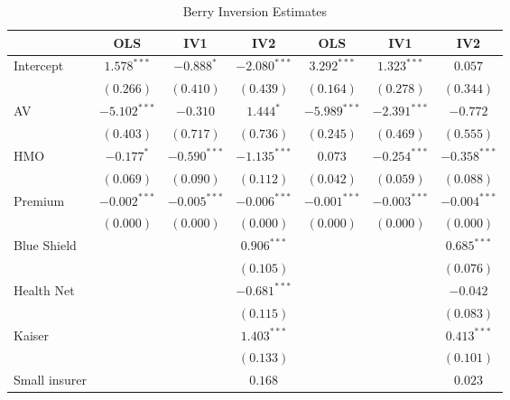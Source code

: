 
\begin{table}
\caption{Berry Inversion Estimates}
\begin{center}
\begin{tabular}{l c c c c c c}
\hline
 & OLS & IV1 & IV2 & OLS & IV1 & IV2 \\
\hline
Intercept     & $1.578^{***}$  & $-0.888^{*}$   & $-2.080^{***}$ & $3.292^{***}$  & $1.323^{***}$  & $0.057$        \\
              & $(0.266)$      & $(0.410)$      & $(0.439)$      & $(0.164)$      & $(0.278)$      & $(0.344)$      \\
AV            & $-5.102^{***}$ & $-0.310$       & $1.444^{*}$    & $-5.989^{***}$ & $-2.391^{***}$ & $-0.772$       \\
              & $(0.403)$      & $(0.717)$      & $(0.736)$      & $(0.245)$      & $(0.469)$      & $(0.555)$      \\
HMO           & $-0.177^{*}$   & $-0.590^{***}$ & $-1.135^{***}$ & $0.073$        & $-0.254^{***}$ & $-0.358^{***}$ \\
              & $(0.069)$      & $(0.090)$      & $(0.112)$      & $(0.042)$      & $(0.059)$      & $(0.088)$      \\
Premium       & $-0.002^{***}$ & $-0.005^{***}$ & $-0.006^{***}$ & $-0.001^{***}$ & $-0.003^{***}$ & $-0.004^{***}$ \\
              & $(0.000)$      & $(0.000)$      & $(0.000)$      & $(0.000)$      & $(0.000)$      & $(0.000)$      \\
Blue Shield   &                &                & $0.906^{***}$  &                &                & $0.685^{***}$  \\
              &                &                & $(0.105)$      &                &                & $(0.076)$      \\
Health Net    &                &                & $-0.681^{***}$ &                &                & $-0.042$       \\
              &                &                & $(0.115)$      &                &                & $(0.083)$      \\
Kaiser        &                &                & $1.403^{***}$  &                &                & $0.413^{***}$  \\
              &                &                & $(0.133)$      &                &                & $(0.101)$      \\
Small insurer &                &                & $0.168$        &                &                & $0.023$        \\

\end{tabular}
\end{center}
\end{table}
